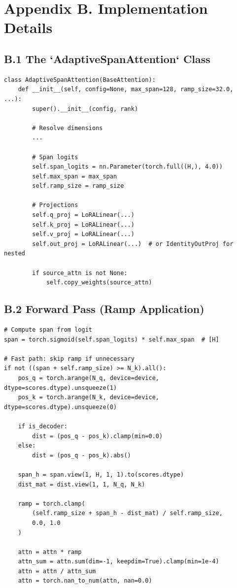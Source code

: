
\section{Appendix B. Implementation Details}

\subsection{B.1 The `AdaptiveSpanAttention` Class}

\begin{lstlisting}
class AdaptiveSpanAttention(BaseAttention):
    def __init__(self, config=None, max_span=128, ramp_size=32.0, ...):
        super().__init__(config, rank)
        
        # Resolve dimensions
        ...
        
        # Span logits
        self.span_logits = nn.Parameter(torch.full((H,), 4.0))
        self.max_span = max_span
        self.ramp_size = ramp_size
        
        # Projections
        self.q_proj = LoRALinear(...)
        self.k_proj = LoRALinear(...)
        self.v_proj = LoRALinear(...)
        self.out_proj = LoRALinear(...)  # or IdentityOutProj for nested
        
        if source_attn is not None:
            self.copy_weights(source_attn)
\end{lstlisting}

\subsection{B.2 Forward Pass (Ramp Application)}

\begin{lstlisting}
# Compute span from logit
span = torch.sigmoid(self.span_logits) * self.max_span  # [H]

# Fast path: skip ramp if unnecessary
if not ((span + self.ramp_size) >= N_k).all():
    pos_q = torch.arange(N_q, device=device, dtype=scores.dtype).unsqueeze(1)
    pos_k = torch.arange(N_k, device=device, dtype=scores.dtype).unsqueeze(0)
    
    if is_decoder:
        dist = (pos_q - pos_k).clamp(min=0.0)
    else:
        dist = (pos_q - pos_k).abs()
    
    span_h = span.view(1, H, 1, 1).to(scores.dtype)
    dist_mat = dist.view(1, 1, N_q, N_k)
    
    ramp = torch.clamp(
        (self.ramp_size + span_h - dist_mat) / self.ramp_size,
        0.0, 1.0
    )
    
    attn = attn * ramp
    attn_sum = attn.sum(dim=-1, keepdim=True).clamp(min=1e-4)
    attn = attn / attn_sum
    attn = torch.nan_to_num(attn, nan=0.0)
\end{lstlisting}

